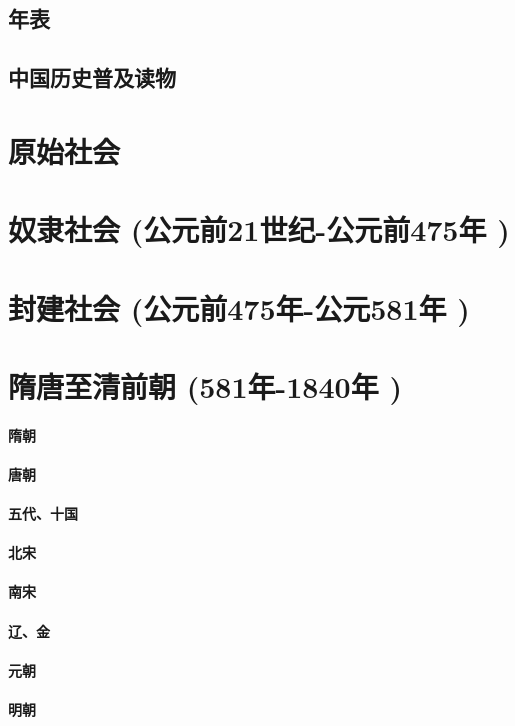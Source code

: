 \documentclass[UTF8]{../../RepresentationUniverse}
\begin{document}
\section{年表}
\section{中国历史普及读物}


\chapter{原始社会}
\chapter{奴隶社会 (公元前21世纪-公元前475年 )}
\chapter{封建社会 (公元前475年-公元581年 )}
\chapter{隋唐至清前朝 (581年-1840年 )}
    \subsubsection{隋朝}
    \subsubsection{唐朝}
    \subsubsection{五代、十国}
    \subsubsection{北宋}
    \subsubsection{南宋}
    \subsubsection{辽、金}
    \subsubsection{元朝}
    \subsubsection{明朝}
\end{document}
